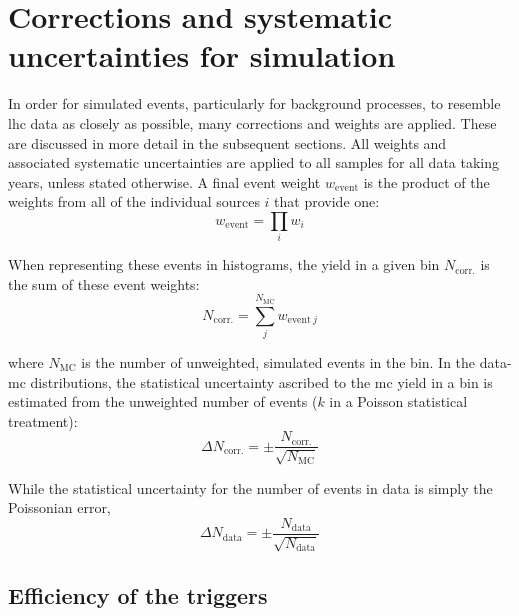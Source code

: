 \section{Corrections and systematic uncertainties for simulation}
\label{sec:htoinv_mc_corrections}

In order for simulated events, particularly for background processes, to resemble \acrshort{lhc} data as closely as possible, many corrections and weights are applied. These are discussed in more detail in the subsequent sections. All weights and associated systematic uncertainties are applied to all samples for all data taking years, unless stated otherwise. A final event weight $w_{\mathrm{event}}$ is the product of the weights from all of the individual sources $i$ that provide one:
\begin{equation}
    w_{\mathrm{event}} = \prod_i w_i
    \label{eq:event_weight}
\end{equation}

When representing these events in histograms, the yield in a given bin $N_{\mathrm{corr.}}$ is the sum of these event weights:
\begin{equation}
    N_{\mathrm{corr.}} = \sum_j^{N_{\mathrm{MC}}} w_{\mathrm{event} \ j}
    \label{eq:bin_weight}
\end{equation}

where $N_{\mathrm{MC}}$ is the number of unweighted, simulated events in the bin. In the data-\acrshort{mc} distributions, the statistical uncertainty ascribed to the \acrshort{mc} yield in a bin is estimated from the unweighted number of events ($k$ in a Poisson statistical treatment):
\begin{equation}
    \Delta N_{\mathrm{corr.}} = \pm \frac{ N_{\mathrm{corr.}} }{ \sqrt{N_{\mathrm{MC}}} }
    \label{eq:uncertainty_mc_ours}
\end{equation}

While the statistical uncertainty for the number of events in data is simply the Poissonian error,
\begin{equation}
    \Delta N_{\mathrm{data}} = \pm \frac{ N_{\mathrm{data}} }{ \sqrt{N_{\mathrm{data}}} }
    \label{eq:uncertainty_data}
\end{equation}




\subsection{Efficiency of the triggers}
\label{subsec:htoinv_trigger_effs}

